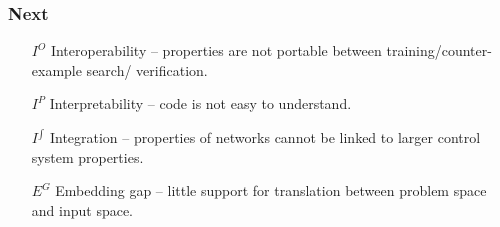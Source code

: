 \documentclass[t,compress,aspectratio=169]{beamer}
\begin{document}
\begin{frame}
\frametitle{Next}

\begin{itemize}
\item[$I^O$] Interoperability -- properties are not portable between training/counter-example search/ verification.

\item[$I^{P}$] Interpretability -- code is not easy to understand.

\item[$I^{\int}$] \alert{Integration -- properties of networks cannot be linked to larger control system properties.}

\item[$E^G$] Embedding gap -- little support for translation between problem space and input space.
\end{itemize}
\end{frame}
\end{document}
